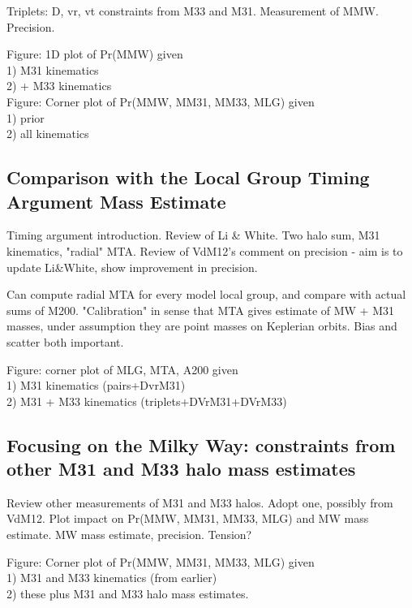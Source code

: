 \documentclass{emulateapj}
\begin{document}
Triplets: D, vr, vt constraints from M33 and M31. 
Measurement of MMW. Precision. 

Figure: 1D plot of Pr(MMW) given \\
  1) M31 kinematics\\
  2) + M33 kinematics\\

Figure: Corner plot of Pr(MMW, MM31, MM33, MLG) given\\
   1) prior \\
   2) all kinematics \\


\subsection{Comparison with the Local Group Timing Argument Mass Estimate}
\label{sec:results:TA}

Timing argument introduction. Review of Li \& White. Two halo sum, M31
kinematics, "radial" MTA. Review of VdM12's comment on precision - aim is to
update Li\&White, show improvement in precision.  

Can compute radial MTA for every model local group,  and compare with actual
sums of M200. "Calibration" in sense that MTA gives estimate of MW + M31
masses, under assumption they are point masses on Keplerian orbits. Bias and
scatter both important.

Figure: corner plot of MLG, MTA, A200 given \\
  1) M31 kinematics (pairs+DvrM31)\\
  2) M31 + M33 kinematics (triplets+DVrM31+DVrM33)\\


\subsection{Focusing on the Milky Way: constraints from other M31 and M33 halo mass estimates}
\label{sec:results:MW}

Review other measurements of M31 and M33 halos. Adopt one, possibly from
VdM12. Plot impact on Pr(MMW, MM31, MM33, MLG) and MW mass estimate. MW mass
estimate, precision. Tension?

Figure: Corner plot of Pr(MMW, MM31, MM33, MLG) given\\
   1) M31 and M33 kinematics (from earlier) \\
   2) these plus M31 and M33 halo mass estimates. \\
\end{document}
